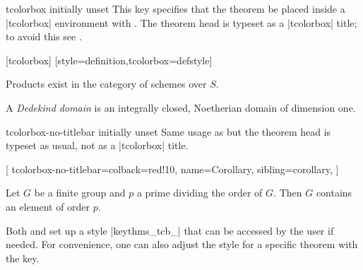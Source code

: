\documentclass{ltxdoc}
\begin{document}
\begin{docKey}{tcolorbox}
  {}
  {initially unset}
This key specifies that the theorem be placed inside a |tcolorbox| environment with .
The theorem head is typeset as a |tcolorbox| title; to avoid this see .

\begin{codepreamble}
[tcolorbox]
[style=definition,tcolorbox={defstyle}]
\end{codepreamble}

\begin{keythmscode}[withpreamble]
\begin{corollary}
Products exist in the category of schemes over $S$.
\end{corollary}
\begin{definition}
A \emph{Dedekind domain} is an integrally closed, Noetherian domain of dimension one.
\end{definition}
\end{keythmscode}

\end{docKey}

\begin{docKey}{tcolorbox-no-titlebar}
  {}
  {initially unset}
Same usage as  but the theorem head is typeset as usual, not as a |tcolorbox| title.

\begin{codepreamble}
[
  tcolorbox-no-titlebar={colback=red!10},
  name=Corollary,
  sibling=corollary,
  ]
\end{codepreamble}

\begin{keythmscode}[withpreamble]
\begin{boxcor}
Let $G$ be a finite group and $p$ a prime dividing the order of $G$. Then $G$ contains an element of order $p$.
\end{boxcor}
\end{keythmscode}

\end{docKey}

\sloppy
Both  and  set up a  style |keythms_tcb_| that can be accessed by the user if needed.
For convenience, one can also adjust the style for a specific theorem with the  key.
\end{document}
